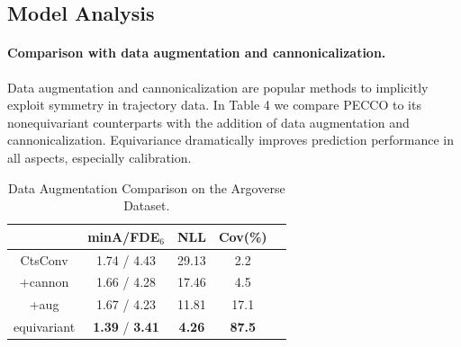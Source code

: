 \begin{table}[h]
\centering{}
\caption{Comparison with conformal prediction methods on Argoverse dataset. PECCO produces a parametric distribution with a tighter confidence region (small MRS), whereby achieving better regression accuracy while maintaining competitive coverage.}
\label{tab:conformal}
\end{table}


\subsection{Model Analysis}
%
\paragraph{Comparison with data augmentation and cannonicalization.}
Data augmentation and cannonicalization are popular methods to implicitly exploit symmetry in trajectory data. In Table 4 we compare PECCO to its nonequivariant counterparts with the addition of data augmentation and cannonicalization. Equivariance dramatically improves prediction performance in all aspects, especially calibration.

\begin{table}
\centering 
\begin{tabular}{ c | c c c c } 
 \toprule
  & minA/FDE$_6$ & NLL & Cov(\%) \\ 
 \midrule
  CtsConv & 1.74 / 4.43  & 29.13 & 2.2 \\
+cannon & 1.66 / 4.28 & 17.46  &  4.5  \\
+aug & 1.67 / 4.23  & 11.81  &  17.1 \\
equivariant & \textbf{1.39} / \textbf{3.41} & \textbf{4.26}  & \textbf{87.5} \\
\bottomrule
 \end{tabular}
\caption{Data Augmentation Comparison on the Argoverse Dataset.}
\label{tab:aug-ablation}
\end{table}

